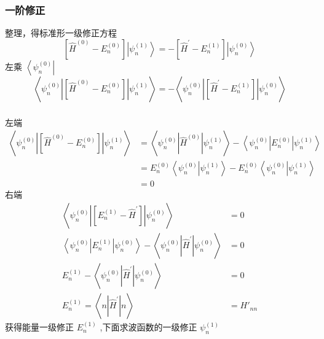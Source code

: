 \begin{frame}
  \frametitle{一阶修正}
\解 整理，得标准形一级修正方程
\begin{equation}\label{eq:yjxz}
  \left[\hat{H}^{(0)}-E_n^{(0)}\right]\left|\psi_n^{(1)}\right\rangle=-\left[\hat{H}^{\prime}-E_n^{(1)}\right]\left| \psi_n^{(0)}\right\rangle
\end{equation}
左乘 $\left\langle\psi_n^{(0)}\right|$
$$
\left\langle\psi_n^{(0)}\left|\left[\hat{H}^{(0)}-E_n^{(0)}\right]\right| \psi_n^{(1)}\right\rangle=-\left\langle\psi_n^{(0)}\left|\left[\hat{H}^{\prime}-E_n^{(1)}\right]\right| \psi_n^{(0)}\right\rangle
$$
\end{frame} 
\begin{frame}
  \frametitle{}
左端
$$
\begin{aligned}
  \left\langle\psi_n^{(0)}\left|\left[\hat{H}^{(0)}-E_n^{(0)}\right]\right| \psi_n^{(1)}\right\rangle & =\left\langle\psi_n^{(0)}\left|\hat{H}^{(0)}\right| \psi_n^{(1)}\right\rangle-\left\langle\psi_n^{(0)}\left|E_n^{(0)}\right| \psi_n^{(1)}\right\rangle \\
  &= E_n^{(0)} \left\langle\psi_n^{(0)}\left|\psi_n^{(1)}\right\rangle\right. - E_n^{(0)} \left\langle\psi_n^{(0)}\left|\psi_n^{(1)}\right\rangle\right. \\
& =0
\end{aligned}
$$
右端
$$
\begin{aligned}
  \left\langle\psi_n^{(0)}\left|\left[E_n^{(1)}-\hat{H}^{\prime}\right]\right| \psi_n^{(0)}\right\rangle &=0 \\
  \left\langle\psi_n^{(0)}\left|E_n^{(1)}\right| \psi_n^{(0)} \right\rangle  -  \left\langle\psi_n^{(0)}\left|\hat{H}^{\prime}\right| \psi_n^{(0)} \right\rangle  &=0 \\ 
  E_n^{(1)} - \left\langle\psi_n^{(0)}\left|\hat{H}^{\prime}\right| \psi_n^{(0)} \right\rangle  &= 0 \\
  E_n^{(1)} = \left\langle n \left|\hat{H}^{\prime}\right| n \right\rangle &= H'_{nn}
\end{aligned}
$$
获得能量一级修正 $ E_n^{(1)}  $ ,下面求波函数的一级修正 $ \psi_n^{(1)}  $ 
\end{frame}

